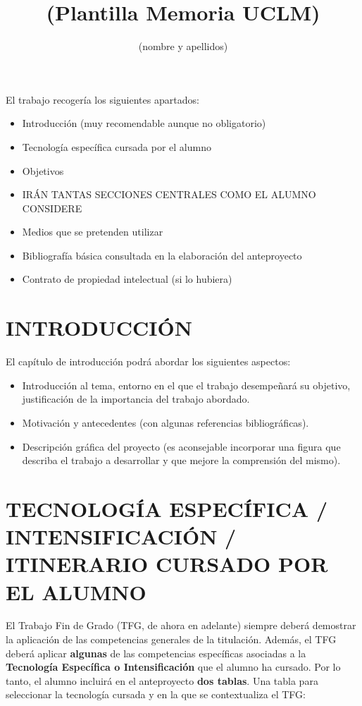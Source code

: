\documentclass{pre-tfg}
\title{(Plantilla Memoria UCLM)}
\author{(nombre y apellidos)}
\begin{document}
\maketitle
\tableofcontents

\newpage

El trabajo recogería los siguientes apartados:

\begin{itemize}
\item Introducción (muy recomendable aunque no obligatorio)
\item Tecnología específica cursada por el alumno
\item Objetivos
\item IRÁN TANTAS SECCIONES CENTRALES COMO EL ALUMNO CONSIDERE
\item Medios que se pretenden utilizar
\item Bibliografía básica consultada en la elaboración del anteproyecto
\item Contrato de propiedad intelectual (si lo hubiera)
\end{itemize}


\section{INTRODUCCIÓN}

El capítulo de introducción podrá abordar los siguientes aspectos:

\begin{itemize}
\item Introducción al tema, entorno en el que el trabajo desempeñará
  su objetivo, justificación de la importancia del trabajo abordado.
\item Motivación y antecedentes (con algunas referencias bibliográficas).
\item Descripción gráfica del proyecto (es aconsejable incorporar una figura que describa
  el trabajo a desarrollar y que mejore la comprensión del mismo).
\end{itemize}


\section{TECNOLOGÍA ESPECÍFICA / INTENSIFICACIÓN / ITINERARIO CURSADO POR EL ALUMNO}

El Trabajo Fin de Grado (TFG, de ahora en adelante) siempre deberá demostrar la aplicación
de las competencias generales de la titulación. Además, el TFG deberá aplicar
\textbf{algunas} de las competencias específicas asociadas a la \textbf{Tecnología
  Específica o Intensificación} que el alumno ha cursado. Por lo tanto, el alumno incluirá
en el anteproyecto \textbf{dos tablas}. Una tabla para seleccionar la tecnología cursada y
en la que se contextualiza el TFG:
\end{document}
